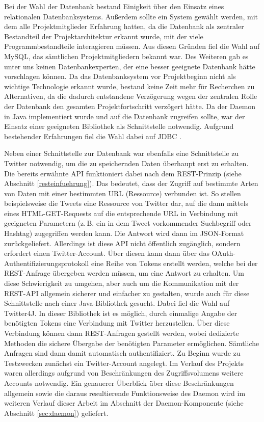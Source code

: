 Bei der Wahl der Datenbank bestand Einigkeit über den Einsatz eines relationalen Datenbanksystems. Außerdem sollte ein System gewählt werden, mit dem alle Projektmitglieder Erfahrung hatten, da die Datenbank als zentraler Bestandteil der Projektarchitektur erkannt wurde, mit der viele Programmbestandteile interagieren müssen. Aus diesen Gründen fiel die Wahl auf MySQL, das sämtlichen Projektmitgliedern bekannt war. Des Weiteren gab es unter uns keinen Datenbankexperten, der eine besser geeignete Datenbank hätte vorschlagen können. Da das Datenbanksystem vor Projektbeginn nicht als wichtige Technologie erkannt wurde, bestand keine Zeit mehr für Recherchen zu Alternativen, da die dadurch entstandene Verzögerung wegen der zentralen Rolle der Datenbank den gesamten Projektfortschritt verzögert hätte. Da der Daemon in Java implementiert wurde und auf die Datenbank zugreifen sollte, war der Einsatz einer geeigneten Bibliothek als Schnittstelle notwendig. Aufgrund bestehender Erfahrungen fiel die Wahl dabei auf JDBC \cite{JDBC}.

Neben einer Schnittstelle zur Datenbank war ebenfalls eine Schnittstelle zu Twitter notwendig, um die zu speichernden Daten überhaupt erst zu erhalten. Die bereits erwähnte API funktioniert dabei nach dem REST-Prinzip (siehe Abschnitt \ref{resteinfuehrung}). Das bedeutet, dass der Zugriff auf bestimmte Arten von Daten mit einer bestimmten URL (Ressource) verbunden ist. So stellen beispielsweise die Tweets eine Ressource von Twitter dar, auf die dann mittels eines HTML-GET-Requests auf die entsprechende URL in Verbindung mit geeigneten Parametern (z.\,B. ein in dem Tweet vorkommender Suchbegriff oder Hashtag) zugegriffen werden kann. Die Antwort wird dann im JSON-Format zurückgeliefert. Allerdings ist diese API nicht öffentlich zugänglich, sondern erfordert einen Twitter-Account. Über diesen kann dann über das OAuth-Authentifizierungsprotokoll eine Reihe von Tokens erstellt werden, welche bei der REST-Anfrage übergeben werden müssen, um eine Antwort zu erhalten. Um diese Schwierigkeit zu umgehen, aber auch um die Kommunikation mit der REST-API allgemein sicherer und einfacher zu gestalten, wurde auch für diese Schnittstelle nach einer Java-Bibliothek gesucht. Dabei fiel die Wahl auf Twitter4J. In dieser Bibliothek ist es möglich, durch einmalige Angabe der benötigten Tokens eine Verbindung mit Twitter herzustellen. Über diese Verbindung können dann REST-Anfragen gestellt werden, wobei dedizierte Methoden die sichere Übergabe der benötigten Parameter ermöglichen. Sämtliche Anfragen sind dann damit automatisch authentifiziert. Zu Beginn wurde zu Testzwecken zunächst ein Twitter-Account angelegt. Im Verlauf des Projekts waren allerdings aufgrund von Beschränkungen des Zugriffsvolumens weitere Accounts notwendig. Ein genauerer Überblick über diese Beschränkungen allgemein sowie die daraus resultierende Funktionsweise des Daemon wird im weiteren Verlauf dieser Arbeit im Abschnitt der Daemon-Komponente (siehe Abschnitt \ref{sec:daemon}) geliefert.

